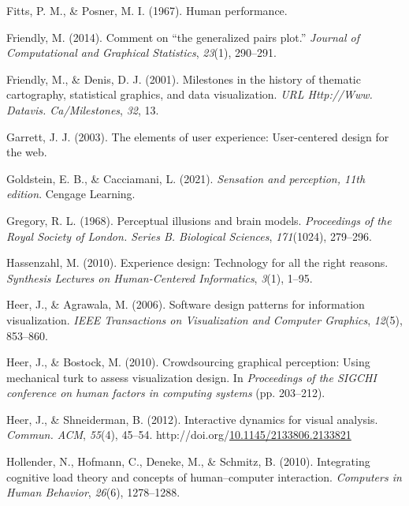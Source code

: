 \documentclass[print]{nuthesis}
\newlength{\cslhangindent}
\newenvironment{CSLReferences}[2]%
{\setlength{\parindent}{0pt}%
\everypar{\setlength{\hangindent}{\cslhangindent}}\ignorespaces}%
{\par}
\begin{document}
\begin{CSLReferences}{1}{0}
\leavevmode{}%
Fitts, P. M., \& Posner, M. I. (1967). Human performance.

\leavevmode{}%
Friendly, M. (2014). Comment on {``the generalized pairs plot.''} \emph{Journal of Computational and Graphical Statistics}, \emph{23}(1), 290--291.

\leavevmode{}%
Friendly, M., \& Denis, D. J. (2001). Milestones in the history of thematic cartography, statistical graphics, and data visualization. \emph{URL Http://Www. Datavis. Ca/Milestones}, \emph{32}, 13.

\leavevmode{}%
Garrett, J. J. (2003). The elements of user experience: User-centered design for the web.

\leavevmode{}%
Goldstein, E. B., \& Cacciamani, L. (2021). \emph{Sensation and perception, 11th edition}. Cengage Learning.

\leavevmode{}%
Gregory, R. L. (1968). Perceptual illusions and brain models. \emph{Proceedings of the Royal Society of London. Series B. Biological Sciences}, \emph{171}(1024), 279--296.

\leavevmode{}%
Hassenzahl, M. (2010). Experience design: Technology for all the right reasons. \emph{Synthesis Lectures on Human-Centered Informatics}, \emph{3}(1), 1--95.

\leavevmode{}%
Heer, J., \& Agrawala, M. (2006). Software design patterns for information visualization. \emph{IEEE Transactions on Visualization and Computer Graphics}, \emph{12}(5), 853--860.

\leavevmode{}%
Heer, J., \& Bostock, M. (2010). Crowdsourcing graphical perception: Using mechanical turk to assess visualization design. In \emph{Proceedings of the SIGCHI conference on human factors in computing systems} (pp. 203--212).

\leavevmode{}%
Heer, J., \& Shneiderman, B. (2012). Interactive dynamics for visual analysis. \emph{Commun. ACM}, \emph{55}(4), 45--54. http://doi.org/\href{https://doi.org/10.1145/2133806.2133821}{10.1145/2133806.2133821}

\leavevmode{}%
Hollender, N., Hofmann, C., Deneke, M., \& Schmitz, B. (2010). Integrating cognitive load theory and concepts of human--computer interaction. \emph{Computers in Human Behavior}, \emph{26}(6), 1278--1288.


\end{CSLReferences}
\end{document}
